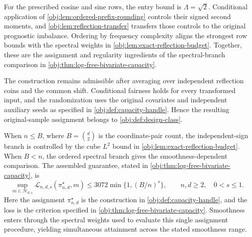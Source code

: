 For the prescribed cosine and sine rows, the entry bound is \(\Lambda=\sqrt2\). Conditional application of \cref{obj:lem:ordered-prefix-rounding} controls their signed second moments, and \cref{obj:lem:reflection-transfer} transfers those controls to the original prognostic imbalance. Ordering by frequency complexity aligns the strongest row bounds with the spectral weights in \cref{obj:lem:exact-reflection-budget}. Together, these are the assignment and regularity ingredients of the spectral-branch comparison in \cref{obj:thm:log-free-bivariate-capacity}.

The construction remains admissible after averaging over independent reflection coins and the common shift. Conditional fairness holds for every transformed input, and the randomization uses the original covariates and independent auxiliary seeds as specified in \cref{obj:def:capacity-handle}. Hence the resulting original-sample assignment belongs to \cref{obj:def:design-class}.

When \(n\leq B\), where \(B=\binom d2\) is the coordinate-pair count, the independent-sign branch is controlled by the cube \(L^2\) bound in \cref{obj:lem:exact-reflection-budget}. When \(B<n\), the ordered spectral branch gives the smoothness-dependent comparison. The assembled guarantee, stated in \cref{obj:thm:log-free-bivariate-capacity}, is
\[
\sup_{m\in\mathcal H_{d,s}}
\mathcal L_{n,d,s}(\pi^\star_{n,d},m)
\leq
3072\min\{1,(B/n)^s\},
\qquad n,d\geq2,\quad 0<s\leq1.
\]
Here the assignment \(\pi^\star_{n,d}\) is the construction in \cref{obj:def:capacity-handle}, and the loss is the criterion specified in \cref{obj:thm:log-free-bivariate-capacity}. Smoothness enters through the spectral weights used to evaluate this single assignment procedure, yielding simultaneous attainment across the stated smoothness range.

